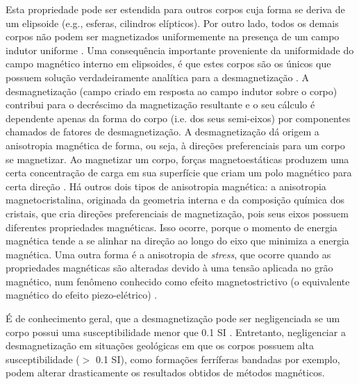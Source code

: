 Esta propriedade pode ser estendida para outros corpos cuja forma se
deriva de um elipsoide (e.g., esferas, cilindros elípticos). Por outro lado, todos
os demais corpos não podem ser magnetizados uniformemente na presença de um
campo indutor uniforme \citep{jahren1963, schlomann1965, clark1999}.
Uma consequência importante proveniente da uniformidade do campo magnético interno em elipsoides, 
é que estes corpos são os únicos que possuem solução 
verdadeiramente analítica para a desmagnetização \citet{clark1986}.
A desmagnetização (campo criado em resposta ao campo indutor sobre o corpo) contribui para o decréscimo da magnetização resultante e o seu cálculo é dependente apenas da forma do corpo (i.e. dos seus semi-eixos) por componentes chamados de fatores de desmagnetização. A desmagnetização dá origem a anisotropia magnética de forma, ou seja, à direções preferenciais para um corpo se magnetizar. Ao magnetizar um corpo, forças magnetoestáticas produzem uma certa concentração de carga em sua superfície que criam um polo magnético para certa direção \citep{hrouda1982, tauxe2003rudiments}.
Há outros dois tipos de anisotropia magnética: a anisotropia magnetocristalina, originada da geometria interna e da composição química dos cristais, que cria direções preferenciais de magnetização, pois seus eixos possuem diferentes propriedades magnéticas. Isso ocorre, porque o momento de energia magnética tende a se alinhar na direção ao longo do eixo que minimiza a energia magnética. Uma outra forma é a anisotropia de \textit{stress}, que ocorre quando as propriedades magnéticas são alteradas devido à uma tensão aplicada no grão magnético, num fenômeno conhecido como efeito magnetostrictivo (o equivalente magnético do efeito piezo-elétrico) \citep{hrouda1982, tauxe2003rudiments, thompson1986}.

É de conhecimento geral, que a desmagnetização pode ser 
negligenciada se um corpo possui uma susceptibilidade menor que 0.1 SI
\citep{austin2014, clark2014, clark1986, emerson1985, eskola1980, guo1998, guo2001, purss2005, hillan2013}.
Entretanto, negligenciar a desmagnetização em situações geológicas em que os corpos possuem 
alta susceptibilidade ($>$ 0.1 SI), como formações ferríferas bandadas por exemplo, podem alterar drasticamente
os resultados obtidos de métodos magnéticos.

